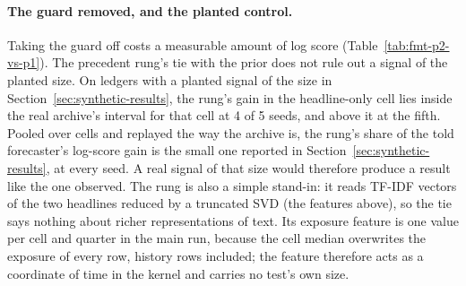 \paragraph{The guard removed, and the planted control.}
Taking the guard off costs a measurable amount of log score (Table~\ref{tab:fmt-p2-vs-p1}). The precedent rung's tie with the prior does not rule out a signal of the planted size. On ledgers with a planted signal of the size in Section~\ref{sec:synthetic-results}, the rung's gain in the headline-only cell lies inside the real archive's interval for that cell at 4 of 5 seeds, and above it at the fifth. Pooled over cells and replayed the way the archive is, the rung's share of the told forecaster's log-score gain is the small one reported in Section~\ref{sec:synthetic-results}, at every seed. A real signal of that size would therefore produce a result like the one observed. The rung is also a simple stand-in: it reads TF-IDF vectors of the two headlines reduced by a truncated SVD (the features above), so the tie says nothing about richer representations of text. Its exposure feature is one value per cell and quarter in the main run, because the cell median overwrites the exposure of every row, history rows included; the feature therefore acts as a coordinate of time in the kernel and carries no test's own size.
